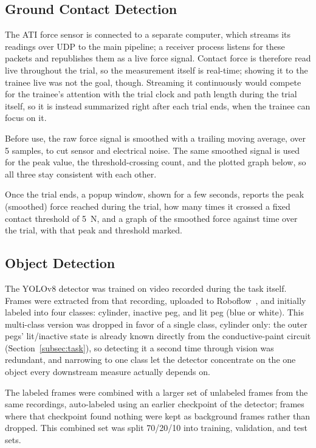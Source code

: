 \subsection{Ground Contact Detection}
\label{subsec:ground_contact}

The ATI force sensor is connected to a separate computer, which
streams its readings over UDP to the main pipeline; a receiver process
listens for these packets and republishes them as a live force
signal. Contact force is therefore read live throughout the trial, so
the measurement itself is real-time; showing it to the trainee live
was not the goal, though. Streaming it continuously would compete for
the trainee's attention with the trial clock and path length during
the trial itself, so it is instead summarized right after each trial
ends, when the trainee can focus on it.

Before use, the raw force signal is smoothed with a trailing moving
average, over 5 samples, to cut sensor and electrical noise. The same
smoothed signal is used for the peak value, the threshold-crossing
count, and the plotted graph below, so all three stay consistent with
each other.

Once the trial ends, a popup window, shown for a few seconds, reports
the peak (smoothed) force reached during the trial, how many times it
crossed a fixed contact threshold of 5~N, and a graph of the smoothed
force against time over the trial, with that peak and threshold
marked.

\subsection{Object Detection}
\label{subsec:object_detection}

The YOLOv8 detector was trained on video recorded during the task
itself. Frames were extracted from that recording, uploaded to
Roboflow~\cite{roboflow}, and initially labeled into four classes:
cylinder, inactive peg, and lit peg (blue or white). This multi-class
version was dropped in favor of a single class, cylinder only: the
outer pegs' lit/inactive state is already known directly from the
conductive-paint circuit (Section~\ref{subsec:task}), so detecting it
a second time through vision was redundant, and narrowing to one class
let the detector concentrate on the one object every downstream
measure actually depends on.

The labeled frames were combined with a larger set of unlabeled frames
from the same recordings, auto-labeled using an earlier checkpoint of
the detector; frames where that checkpoint found nothing were kept as
background frames rather than dropped. This combined set was split
70/20/10 into training, validation, and test sets.

